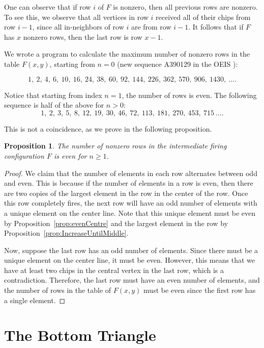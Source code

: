 \documentclass[11pt]{article}
\newtheorem{proposition}[theorem]{Proposition}
\theoremstyle{definition}
\theoremstyle{remark}
\begin{document}
One can observe that if row $i$ of $F$ is nonzero, then all previous rows are nonzero. To see this, we observe that all vertices in row $i$ received all of their chips from row $i-1$, since all in-neighbors of row $i$ are from row $i-1$. It follows that if $F$ has $x$ nonzero rows, then the last row is row $x-1$.

We wrote a program to calculate the maximum number of nonzero rows in the table $F(x,y)$, starting from $n=0$ (new sequence A390129 in the OEIS \cite{oeis}):

\[1,\ 2,\ 4,\ 6,\ 10,\ 16,\ 24,\ 38,\ 60,\ 92,\ 144,\ 226,\ 362,\ 570,\ 906,\ 1430,\ \ldots.\]

Notice that starting from index $n=1$, the number of rows is even. The following sequence is half of the above for $n > 0$:
\[1,\ 2,\ 3,\ 5,\ 8,\ 12,\ 19,\ 30,\ 46,\ 72,\ 113,\ 181,\ 270,\ 453,\ 715\ \ldots.\] 

This is not a coincidence, as we prove in the following proposition.
\begin{proposition}
    The number of nonzero rows in the intermediate firing configuration $F$ is even for $n\geq 1$.
\end{proposition}
\begin{proof}
    We claim that the number of elements in each row alternates between odd and even. This is because if the number of elements in a row is even, then there are two copies of the largest element in the row in the center of the row. Once this row completely fires, the next row will have an odd number of elements with a unique element on the center line. Note that this unique element must be even by Proposition~\ref{prop:evenCentre} and the largest element in the row by Proposition~\ref{prop:IncreaseUntilMiddle}. 

    Now, suppose the last row has an odd number of elements. Since there must be a unique element on the center line, it must be even. However, this means that we have at least two chips in the central vertex in the last row, which is a contradiction. Therefore, the last row must have an even number of elements, and the number of rows in the table of $F(x,y)$ must be even since the first row has a single element.
\end{proof}



\section{The Bottom Triangle}\label{sec:BottomTriangle}
\end{document}
